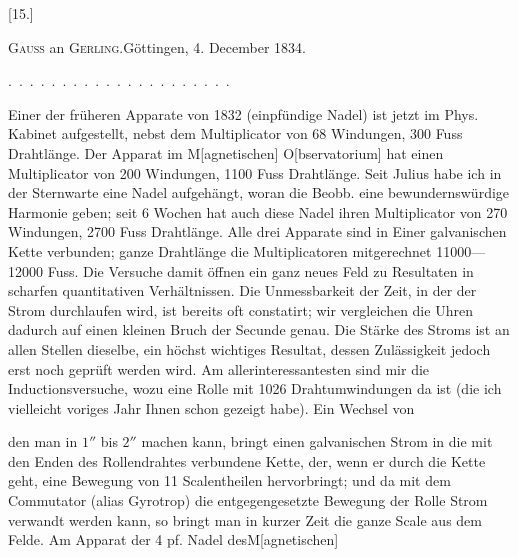 \clearpage\begingroup{}
\begin{center}[15.]\end{center}
\begin{center}\textsc{Gauss} an \textsc{Gerling}.\quad Göttingen, 4. December 1834.\end{center}
\noindent .\ .\ .\ .\ .\ .\ .\ .\ .\ .\ .\ .\ .\ .\ .\ .\ .\ .\ .\ .\ .
\par\noindent\hspace*{\parindent}Einer der früheren Apparate von 1832 (einpfündige Nadel) ist jetzt im
Phys. Kabinet aufgestellt, nebst dem Multiplicator von 68 Windungen, 300
Fuss Drahtlänge. Der Apparat im M[agnetischen] O[bservatorium] hat einen
Multiplicator von 200 Windungen, 1100 Fuss Drahtlänge. Seit Julius habe
ich in der Sternwarte eine  Nadel aufgehängt, woran die Beobb.
eine bewundernswürdige Harmonie geben; seit 6 Wochen hat auch diese Nadel
ihren Multiplicator von 270 Windungen, 2700 Fuss Drahtlänge. Alle drei Apparate
sind in Einer galvanischen Kette verbunden; ganze Drahtlänge die Multiplicatoren
mitgerechnet 11000---12000 Fuss. Die Versuche damit öffnen ein
ganz neues Feld zu Resultaten in scharfen quantitativen Verhältnissen. Die
Unmessbarkeit der Zeit, in der der Strom durchlaufen wird, ist bereits oft
constatirt; wir vergleichen die Uhren dadurch auf einen kleinen Bruch der
Secunde genau. Die Stärke des Stroms ist an allen Stellen dieselbe, ein
höchst wichtiges Resultat, dessen Zulässigkeit  jedoch erst
noch geprüft werden wird. Am allerinteressantesten sind mir die Inductionsversuche,
wozu eine Rolle mit 1026 Drahtumwindungen da ist (die ich vielleicht
voriges Jahr Ihnen schon gezeigt habe). Ein Wechsel von
\par\nopagebreak\begin{center}\end{center}
\noindent den man in \(1''\) bis \(2''\) machen kann, bringt einen galvanischen Strom in die mit
den Enden des Rollendrahtes verbundene Kette, der, wenn er durch die 
Kette geht, eine Bewegung von 11 Scalentheilen hervorbringt; und da mit
dem Commutator (alias Gyrotrop) die entgegengesetzte Bewegung der Rolle 
 Strom verwandt werden kann, so bringt man in kurzer Zeit die
\clearpage{}
\noindent ganze Scale aus dem Felde. Am Apparat der 4 pf. Nadel des\linebreak M[agnetischen]
